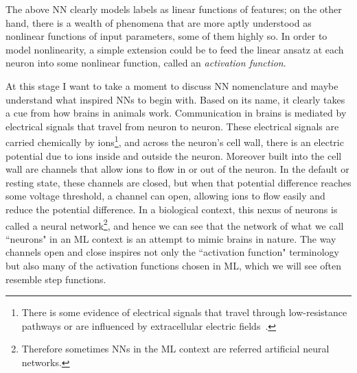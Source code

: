 The above NN clearly models labels as linear functions of features; on the other
hand, there is a wealth of phenomena that are more aptly understood as nonlinear
functions of input parameters, some of them highly so. In order to model
nonlinearity, a simple extension could be to feed the linear ansatz at each
neuron into some nonlinear function, called an {\it activation
function}.  

At this stage I want to take a moment to discuss NN nomenclature and maybe
understand what inspired NNs to begin with. 
Based on its name, it clearly takes a cue from how
brains in animals work. Communication in brains is mediated by electrical
signals that travel from neuron to neuron. These electrical signals are
carried chemically by ions\footnote{There is some evidence
of electrical signals that travel through low-resistance pathways or
are influenced by extracellular electric fields~\cite{faber_two_2018}.},
and across the neuron's cell wall, there is an electric potential due to ions 
inside and outside the neuron. Moreover built into the cell wall are channels
that allow ions to flow in or out of the neuron. In the default or resting
state, these channels are closed, but when that potential difference reaches
some voltage threshold, a channel can open, allowing ions to flow easily
and reduce the potential difference. In a biological context, this
nexus of neurons is called a neural network\footnote{Therefore sometimes NNs
in the ML context are referred artificial neural networks.}, and hence
we can see that the network of what we call ``neurons" in an ML context
is an attempt to mimic brains in nature. The way channels open and close
 inspires not only the ``activation function" terminology but also many of 
the activation functions chosen in ML, which we will see often resemble 
step functions.

